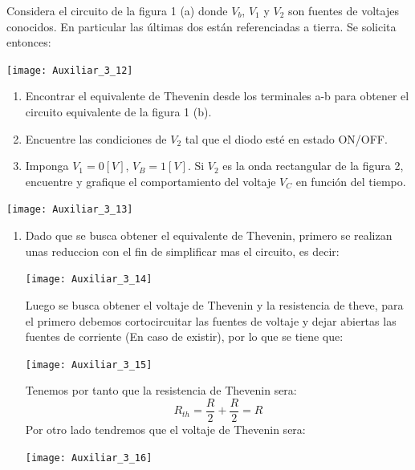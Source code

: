 \documentclass[
  11pt,
  letterpaper,
   addpoints,
   answers
  ]{exam}
\begin{document}
\begin{questions}
\question Considera el circuito de la figura 1 (a) donde $V_b$, $V_1$ y $V_2$ son fuentes de voltajes conocidos. En particular las últimas dos están referenciadas a tierra.
Se solicita entonces:
\begin{center}
    \texttt{[image: Auxiliar\_3\_12]}
\end{center}
\begin{enumerate}
    \item Encontrar el equivalente de Thevenin desde los terminales a-b para obtener el circuito equivalente de la figura 1 (b). 
    \item Encuentre las condiciones de $V_2$ tal que el diodo esté en estado ON/OFF. 
    \item Imponga $V_1 = 0 [V]$, $V_B = 1 [V]$. Si $V_2$ es la onda rectangular de la figura 2, encuentre y grafique el comportamiento del voltaje $V_C$ en función del tiempo. 
\end{enumerate}
\begin{center}
    \texttt{[image: Auxiliar\_3\_13]}
\end{center}
\begin{solution}
    \begin{enumerate}
        \item Dado que se busca obtener el equivalente de Thevenin, primero se realizan unas reduccion con el fin de simplificar mas el circuito, es decir:
        \begin{center}
            \texttt{[image: Auxiliar\_3\_14]}
        \end{center}
    Luego se busca obtener el voltaje de Thevenin y la resistencia de theve, para el primero debemos cortocircuitar las fuentes de voltaje y dejar abiertas las fuentes de corriente (En caso de existir), por lo que se tiene que:
    \begin{center}
        \texttt{[image: Auxiliar\_3\_15]}
    \end{center}
    Tenemos por tanto que la resistencia de Thevenin sera:
    \begin{equation}
        R_{th} = \frac{R}{2} + \frac{R}{2} = R
    \end{equation}
    Por otro lado tendremos que el voltaje de Thevenin sera:
    \begin{center}
        \texttt{[image: Auxiliar\_3\_16]}

\end{center}
\end{enumerate}
\end{solution}
\end{questions}
\end{document}
